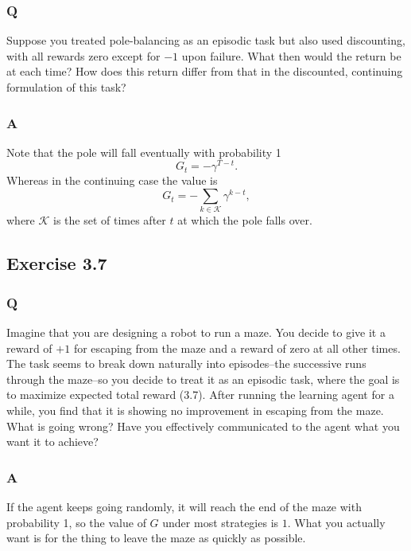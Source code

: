 \subsubsection{Q}
Suppose you treated pole-balancing as an episodic task but also used discounting, with all rewards zero except for $-1$ upon failure. What then would the return be at each time? How does this return differ from that in the discounted, continuing formulation of this task?

\subsubsection{A}
Note that the pole will fall eventually with probability 1
\begin{equation}
    G_t = - \gamma^{T - t}.
\end{equation}
Whereas in the continuing case the value is
\begin{equation}
    G_t = - \sum_{k \in \mathcal{K}} \gamma^{k - t},
\end{equation}
where $\mathcal{K}$ is the set of times after $t$ at which the pole falls over.

\subsection{Exercise 3.7}
\subsubsection{Q}
Imagine that you are designing a robot to run a maze. You decide to give it a reward of $+1$ for escaping from the maze and a reward of zero at all other times. The task seems to break down naturally into episodes--the successive runs through the maze--so you decide to treat it as an episodic task, where the goal is to maximize expected total reward (3.7). After running the learning agent for a while, you find that it is showing no improvement in escaping from the maze. What is going wrong? Have you effectively communicated to the agent what you want it to achieve?

\subsubsection{A}
If the agent keeps going randomly, it will reach the end of the maze with probability 1, so the value of $G$ under most strategies is $1$. What you actually want is for the thing to leave the maze as quickly as possible.\\


